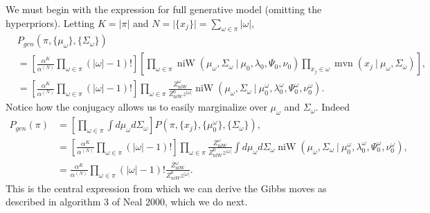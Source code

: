 \documentclass[11pt, oneside]{article}   	%
\DeclareMathOperator{\niW}{niW}
\begin{document}
We must begin with the expression for full generative model (omitting the hyperpriors). Letting $K = \vert\pi\vert$ and $N = \vert\lbrace x_j\rbrace\vert = \sum_{\omega\in\pi}\vert\omega\vert$,
\begin{equation}\begin{split}
&P_{gen}(\pi, \lbrace\mu_\omega\rbrace, \lbrace\Sigma_\omega\rbrace)\\
&= \left[\frac{\alpha^K}{\alpha^{(N)}}\prod_{\omega\in\pi}(\vert\omega\vert - 1)!\right]\left[\prod_{\omega\in\pi}\niW(\mu_\omega,\Sigma_\omega~\vert~\mu_0,\lambda_0,\Psi_0,\nu_0)\prod_{x_j\in\omega} \operatorname{mvn}(x_j~\vert~\mu_\omega,\Sigma_\omega)\right],\\
&= \left[\frac{\alpha^K}{\alpha^{(N)}}\prod_{\omega\in\pi}(\vert\omega\vert - 1)!\right]\prod_{\omega\in\pi}\frac{Z^\omega_{\niW}}{Z_{\niW}^0 z^{\vert\omega\vert}}\niW(\mu_\omega,\Sigma_\omega~\vert~\mu_0^\omega, \lambda_0^\omega, \Psi_0^\omega, \nu_0^\omega).
\end{split}\end{equation}
Notice how the conjugacy allows us to easily marginalize over $\mu_\omega$ and $\Sigma_\omega$. Indeed
\begin{equation}\begin{split}
P_{gen}(\pi) &= \left[\prod_{\omega\in\pi}\int d\mu_\omega d\Sigma_\omega\right]P(\pi, \lbrace x_j\rbrace, \lbrace\mu_0^\omega\rbrace, \lbrace\Sigma_\omega\rbrace),\\
&= \left[\frac{\alpha^K}{\alpha^{(N)}}\prod_{\omega\in\pi}(\vert\omega\vert - 1)!\right]\prod_{\omega\in\pi}\frac{Z^\omega_{\niW}}{Z_{\niW}^0 z^{\vert\omega\vert}}\int d\mu_\omega d\Sigma_\omega \niW(\mu_\omega,\Sigma_\omega~\vert~\mu_0^\omega, \lambda_0^\omega, \Psi_0^\omega, \nu_0^\omega),\\
&= \frac{\alpha^K}{\alpha^{(N)}}\prod_{\omega\in\pi}(\vert\omega\vert - 1)! \frac{Z^\omega_{\niW}}{Z_{niW}^0 z^{\vert\omega\vert}}.
\end{split}\end{equation}
This is the central expression from which we can derive the Gibbs moves as described in algorithm 3 of Neal 2000, which we do next.
\end{document}
